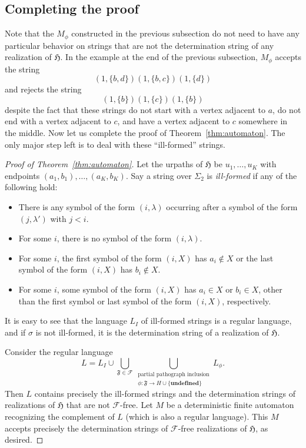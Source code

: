 \documentclass{article}
\newcommand{\Fc}{\mathcal{F}}
\newcommand{\Ff}{\mathfrak{F}}
\newcommand{\Hf}{\mathfrak{H}}
\newcommand{\ud}{\mathbf{undefined}}
\begin{document}
\subsection{Completing the proof}

Note that the $M_\phi$ constructed in the previous subsection do not need to have any particular behavior on strings that are not the determination string of any realization of $\Hf$. In the example at the end of the previous subsection, $M_\phi$ accepts the string
\[ (1, \{b, d\})(1, \{b, c\})(1, \{d\}) \]
and rejects the string
\[ (1, \{b\})(1, \{c\})(1, \{b\}) \]
despite the fact that these strings do not start with a vertex adjacent to $a$, do not end with a vertex adjacent to $c$, and have a vertex adjacent to $c$ somewhere in the middle. Now let us complete the proof of Theorem~\ref{thm:automaton}. The only major step left is to deal with these ``ill-formed'' strings.

\begin{proof}[Proof of Theorem~\ref{thm:automaton}]
Let the urpaths of $\Hf$ be $u_1, \dots, u_K$ with endpoints $(a_1, b_1), \dots, (a_K, b_K)$. Say a string over $\Sigma_2$ is \textit{ill-formed} if any of the following hold:
\begin{itemize}
    \item There is any symbol of the form $(i, \lambda)$ occurring after a symbol of the form $(j, \lambda')$ with $j<i$.
    \item For some $i$, there is no symbol of the form $(i, \lambda)$.
    \item For some $i$, the first symbol of the form $(i, X)$ has $a_i\not\in X$ or the last symbol of the form $(i, X)$ has $b_i\not\in X$.
    \item For some $i$, some symbol of the form $(i, X)$ has $a_i\in X$ or $b_i\in X$, other than the first symbol or last symbol of the form $(i, X)$, respectively.
\end{itemize}
It is easy to see that the language $L_I$ of ill-formed strings is a regular language, and if $\sigma$ is not ill-formed, it is the determination string of a realization of $\Hf$.

Consider the regular language
\[ L=L_I\cup\bigcup_{\Ff\in \Fc}\bigcup_{\substack{\text{partial pathograph inclusion} \\ \phi:\Ff\to H\cup\{\ud\}}} L_\phi. \]
Then $L$ contains precisely the ill-formed strings and the determination strings of realizations of $\Hf$ that are not $\Fc$-free. Let $M$ be a deterministic finite automaton recognizing the complement of $L$ (which is also a regular language). This $M$ accepts precisely the determination strings of $\Fc$-free realizations of $\Hf$, as desired.
\end{proof}
\end{document}
